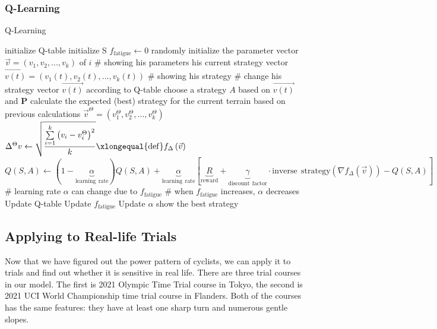 \documentclass{article}
\begin{document}
			\subsubsection{Q-Learning}
				\begin{algorithm}
					\caption{Q-Learning}
					\begin{algorithmic}
						\STATE initialize Q-table
						\STATE initialize S
						\STATE $f_{\mathrm{fatigue}}\leftarrow 0$
						\STATE randomly initialize the parameter vector $\vec{v}=\left( v_1,v_2,...,v_k \right)$ of $i$ \# showing his parameters
						\STATE his current strategy vector $\vec{v\left(t\right)}=\left( v_1\left(t\right),v_2\left(t\right),...,v_k\left(t\right) \right)$ \# showing his strategy
						\ENDFOR
						\STATE \# change his strategy vector $\vec{v\left(t\right)}$ according to Q-table
						\STATE choose a strategy \textbf{$A$} based on $\vec{v\left(t\right)}$ and \textbf{P}
						\STATE calculate the expected (best) strategy for the current terrain based on previous calculations $\vec{v}^{\Theta}=\left( v_{1}^{\Theta},v_{2}^{\Theta},...,v_{k}^{\Theta} \right) $
						\STATE
						\STATE $\Delta ^{\Theta}v\leftarrow \sqrt{\dfrac{\sum\limits_{i=1}^k{\left( v_i-v_{i}^{\Theta} \right) ^2}}{k}}\xlongequal{\mathrm{def}}f_{\Delta}\left( \vec{v} \right) $
						\STATE
						\STATE $Q(S,A)\gets (1-\underset{\mathrm{learning}\:\:\mathrm{rate}}{\underbrace{\alpha }})Q(S,A)+\underset{\mathrm{learning}\:\:\mathrm{rate}}{\underbrace{\alpha }}[\underset{\mathrm{reward}}{\underbrace{R}}+\underset{\mathrm{discount}\:\:\mathrm{factor}}{\underbrace{\gamma }}\cdot \mathrm{inverse}\:\:\mathrm{strategy}\left( \nabla f_{\Delta}\left( \vec{v} \right) \right) -Q(S,A)]$
						\STATE
						\STATE \# learning rate $\alpha$ can change due to $f_{\mathrm{fatigue}}$
						\STATE \# when $f_{\mathrm{fatigue}}$ increases, $\alpha$ decreases
						\STATE Update Q-table
						\STATE Update $f_{\mathrm{fatigue}}$
						\STATE Update $\alpha$
						\ENDWHILE
						\STATE show the best strategy
					\end{algorithmic}
				\end{algorithm}


		\subsection{Applying to Real-life Trials}
		Now that we have figured out the power pattern of cyclists, we can apply it to trials and find out whether it is sensitive in real life. There are three trial courses in our model. The first is 2021 Olympic Time Trial course in Tokyo\cite{tokyo}, the second is 2021 UCI World Championship time trial course in Flanders\cite{UCI}. Both of the courses has the same features: they have at least one sharp turn and numerous gentle slopes.
\end{document}
